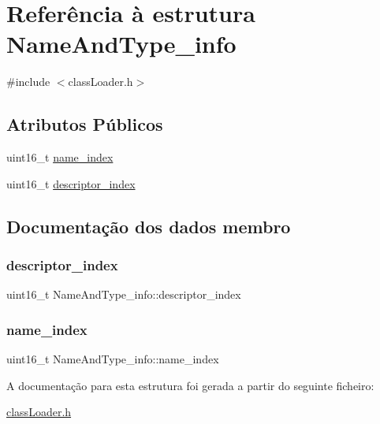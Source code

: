 \hypertarget{struct_name_and_type__info}{}\section{Referência à estrutura Name\+And\+Type\+\_\+info}
\label{struct_name_and_type__info}


{\ttfamily \#include $<$class\+Loader.\+h$>$}

\subsection*{Atributos Públicos}
\begin{DoxyCompactItemize}
\item 
uint16\+\_\+t \hyperlink{struct_name_and_type__info_afb16b3760b4845a8f63ccf48fbd009b7}{name\+\_\+index}
\item 
uint16\+\_\+t \hyperlink{struct_name_and_type__info_af66243f1e1168984465aaa8fa6ee1184}{descriptor\+\_\+index}
\end{DoxyCompactItemize}


\subsection{Documentação dos dados membro}
\hypertarget{struct_name_and_type__info_af66243f1e1168984465aaa8fa6ee1184}{}\label{struct_name_and_type__info_af66243f1e1168984465aaa8fa6ee1184} 
\subsubsection{\texorpdfstring{descriptor\+\_\+index}{descriptor\_index}}
{\footnotesize\ttfamily uint16\+\_\+t Name\+And\+Type\+\_\+info\+::descriptor\+\_\+index}

\hypertarget{struct_name_and_type__info_afb16b3760b4845a8f63ccf48fbd009b7}{}\label{struct_name_and_type__info_afb16b3760b4845a8f63ccf48fbd009b7} 
\subsubsection{\texorpdfstring{name\+\_\+index}{name\_index}}
{\footnotesize\ttfamily uint16\+\_\+t Name\+And\+Type\+\_\+info\+::name\+\_\+index}



A documentação para esta estrutura foi gerada a partir do seguinte ficheiro\+:\begin{DoxyCompactItemize}
\item 
\hyperlink{class_loader_8h}{class\+Loader.\+h}\end{DoxyCompactItemize}
